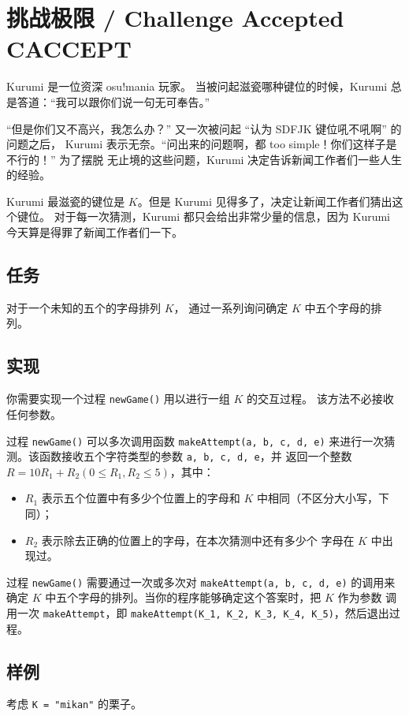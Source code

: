 \documentclass[UTF8, 11pt, a4paper]{article}
\begin{document}
\section*{挑战极限 / Challenge Accepted \makebox[2.5em]{} \small{CACCEPT}}

Kurumi 是一位资深 osu!mania 玩家。%
当被问起滋瓷哪种键位的时候，Kurumi 总是答道：“我可以跟你们说一句无可奉告。”%

“但是你们又不高兴，我怎么办？” 又一次被问起 “认为 SDFJK 键位吼不吼啊” 的问题之后，%
Kurumi 表示无奈。“问出来的问题啊，都 too simple！你们这样子是不行的！” 为了摆脱%
无止境的这些问题，Kurumi 决定告诉新闻工作者们一些人生的经验。

Kurumi 最滋瓷的键位是 $K$。但是 Kurumi 见得多了，决定让新闻工作者们猜出这个键位。%
对于每一次猜测，Kurumi 都只会给出非常少量的信息，因为 Kurumi 今天算是得罪了新闻工作者们一下。

\subsection*{任务}
对于一个未知的五个的字母排列 $K$，%
通过一系列询问确定 $K$ 中五个字母的排列。

\subsection*{实现}
你需要实现一个过程 \texttt{newGame()} 用以进行一组 $K$ 的交互过程。%
该方法不必接收任何参数。

过程 \texttt{newGame()} 可以多次调用函数 \texttt{makeAttempt(a, b, c, d, e)}%
来进行一次猜测。该函数接收五个字符类型的参数 \texttt{a, b, c, d, e}，并%
返回一个整数 $R = 10R_1 + R_2 (0 \leq R_1, R_2 \leq 5)$，其中：
\begin{itemize}
    \item $R_1$ 表示五个位置中有多少个位置上的字母和 $K$ 中相同（不区分大小写，下同）；
    \item $R_2$ 表示除去正确的位置上的字母，在本次猜测中还有多少个%
        字母在 $K$ 中出现过。
\end{itemize}

过程 \texttt{newGame()} 需要通过一次或多次对 \texttt{makeAttempt(a, b, c, d, e)}%
的调用来确定 $K$ 中五个字母的排列。当你的程序能够确定这个答案时，把 $K$ 作为参数%
调用一次 \texttt{makeAttempt}，即 \texttt{makeAttempt(K\_1, K\_2, K\_3, K\_4, K\_5)}，然后退出过程。

\subsection*{样例}
考虑 \texttt{K = "mikan"} 的栗子。
\end{document}
